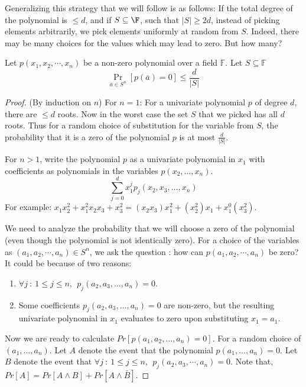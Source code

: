 Generalizing this strategy that we will follow is as follows: If the total degree of
the polynomial is $\leq d$, and if $S \subseteq \F$, such that
$|S|\geq 2d$, instead of picking elements arbitrarily, we pick
elements uniformly at random from $S$. Indeed, there may be many
choices for the values which may lead to zero. But how many?

\begin{lemma}
Let $p(x_1, x_2, \cdots , x_n)$ be a non-zero polynomial over a field
$\mathbb{F}$. Let $S\subseteq \mathbb{F}$
$$\Pr_{\overline{a} \in S^n}[p(\overline{a})=0]\leq \frac{d}{|S|}$$
\end{lemma}
\begin{proof}
(By induction on $n$) For $n=1$: For a univariate polynomial $p$ of
  degree $d$, there are $\leq d$ roots. Now in the worst case the set
  $S$ that we picked has all $d$ roots. Thus for a random choice of
  substitution for the variable from $S$, the probability that it is a zero of
  the polynomial $p$ is at most $\frac{d}{|S|}$.

For $n>1$, write the polynomial $p$ as a univariate polynomial in $x_1$ with coefficients as polynomials in the variables $p(x_2, \ldots, x_n)$.
$$ \displaystyle \sum_{j=0}^{d}x_1^jp_j(x_2, x_3, \ldots, x_n)$$
\noindent For example: $x_1x_2^2+x_1^2x_2x_3+x_3^2=(x_2x_3)x_1^2+(x_2^2)x_1+x_1^0(x_3^2)$.

We need to analyze the probability that we will choose a zero of the
polynomial (even though the polynomial is not identically zero). For a
choice of the variables as $(a_1, a_2, \cdots, a_n)\in S^n$, we ask
the question : how can $p(a_1, a_2, \cdots, a_n)$ be zero? It could be
because of two reasons:

\begin{enumerate}
\item $\forall j~:~1 \le j \le n , ~~ p_j(a_2, a_3, \ldots , a_n)=0$.
\item %
Some coefficients $p_j(a_2, a_3, \ldots , a_n)=0$ are non-zero, but
the resulting univariate polynomial in $x_1$ evaluates to zero upon
substituting $x_1 = a_1$.
\end{enumerate}

\noindent Now we are ready to calculate $Pr [ p(a_1, a_2, \ldots, a_n) = 0 ]$.
For a random choice of $(a_1, \ldots, a_n)$.
Let $A$ denote the event that the polynomial $p(a_1, \ldots, a_n) = 0$.
Let $B$ denote the event that $\forall j~:~1 \le j \le n ,~~p_j(a_2, a_3, \cdots , a_n)=0$.
Note that, $Pr[A] = Pr[A \land B]+Pr[A\land \bar{B}]$.


\end{proof}
